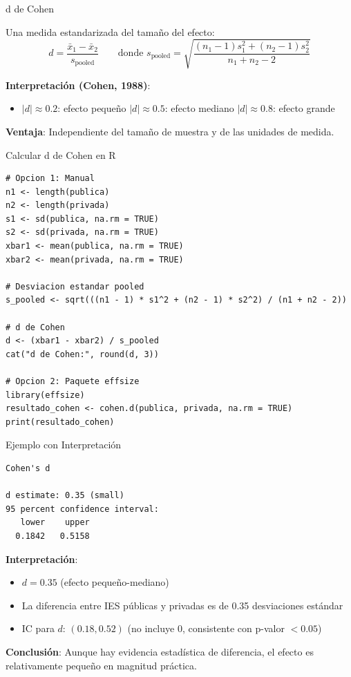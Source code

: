 \documentclass[aspectratio=169, 11pt]{beamer}
\begin{document}
\begin{frame}{d de Cohen}
\begin{definition}[d de Cohen]
Una medida estandarizada del tamaño del efecto:
\[
d = \frac{\bar{x}_1 - \bar{x}_2}{s_{\text{pooled}}} \qquad \text{donde } s_{\text{pooled}} = \sqrt{\frac{(n_1 - 1)s_1^2 + (n_2 - 1)s_2^2}{n_1 + n_2 - 2}}
\]
\end{definition}

\vspace{0.2cm}
\textbf{Interpretación (Cohen, 1988)}:
\begin{itemize}
  \item $|d| \approx 0.2$: efecto \alert{pequeño} \quad $|d| \approx 0.5$: efecto \alert{mediano} \quad $|d| \approx 0.8$: efecto \alert{grande}
\end{itemize}

\vspace{0.2cm}
\textbf{Ventaja}: Independiente del tamaño de muestra y de las unidades de medida.
\end{frame}

\begin{frame}[fragile]{Calcular d de Cohen en R}
\begin{lstlisting}[basicstyle=\ttfamily\scriptsize]
# Opcion 1: Manual
n1 <- length(publica)
n2 <- length(privada)
s1 <- sd(publica, na.rm = TRUE)
s2 <- sd(privada, na.rm = TRUE)
xbar1 <- mean(publica, na.rm = TRUE)
xbar2 <- mean(privada, na.rm = TRUE)

# Desviacion estandar pooled
s_pooled <- sqrt(((n1 - 1) * s1^2 + (n2 - 1) * s2^2) / (n1 + n2 - 2))

# d de Cohen
d <- (xbar1 - xbar2) / s_pooled
cat("d de Cohen:", round(d, 3))

# Opcion 2: Paquete effsize
library(effsize)
resultado_cohen <- cohen.d(publica, privada, na.rm = TRUE)
print(resultado_cohen)
\end{lstlisting}
\end{frame}

\begin{frame}[fragile]{Ejemplo con Interpretación}
\begin{lstlisting}[basicstyle=\ttfamily\footnotesize]
Cohen's d

d estimate: 0.35 (small)
95 percent confidence interval:
   lower    upper
  0.1842   0.5158
\end{lstlisting}

\vspace{0.3cm}
\textbf{Interpretación}:
\begin{itemize}
  \item $d = 0.35$ (efecto pequeño-mediano)
  \item La diferencia entre IES públicas y privadas es de 0.35 desviaciones estándar
  \item IC para $d$: $(0.18, 0.52)$ (no incluye 0, consistente con p-valor $< 0.05$)
\end{itemize}

\vspace{0.3cm}
\textbf{Conclusión}: Aunque hay evidencia estadística de diferencia, el efecto es relativamente pequeño en magnitud práctica.
\end{frame}
\end{document}
